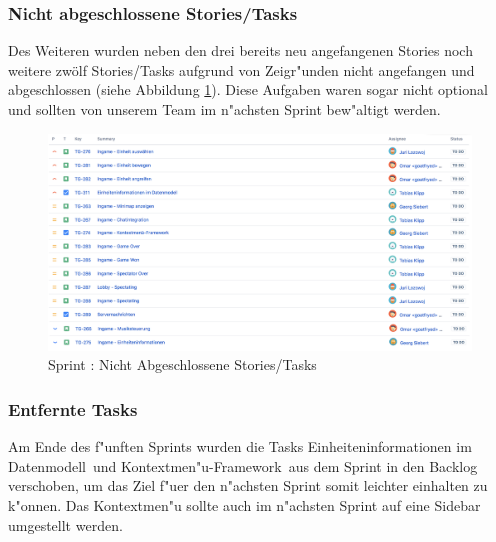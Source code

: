 \documentclass[12pt, titlepage]{scrartcl}
\newcommand{\RN}[1]{%
	\textup{\uppercase\expandafter{\romannumeral#1}}%
}
\begin{document}
        	\subsubsection{Nicht abgeschlossene Stories/Tasks}
        		Des Weiteren wurden neben den drei bereits neu angefangenen Stories noch weitere zw\"olf Stories/Tasks aufgrund von Zeigr"unden nicht angefangen und abgeschlossen (siehe Abbildung \ref{To_Do_5}). Diese Aufgaben waren sogar nicht optional und sollten von unserem Team im n"achsten Sprint bew"altigt werden.
        		\begin{figure}[H] 
        			\centering
        			\includegraphics[width=\textwidth]{images/sprintV/toDo.png}
        			\caption{Sprint \RN{5}: Nicht Abgeschlossene Stories/Tasks}
        			\label{To_Do_5}
        		\end{figure}
        	\subsubsection{Entfernte Tasks}
        		Am Ende des f"unften Sprints wurden die Tasks \glqq Einheiteninformationen im Datenmodell\grqq\ und \glqq Kontextmen"u-Framework\grqq\ aus dem Sprint in den Backlog verschoben, um das Ziel f"uer den n"achsten Sprint somit leichter einhalten zu k"onnen. Das Kontextmen"u sollte auch im n"achsten Sprint auf eine Sidebar umgestellt werden. 
\end{document}
